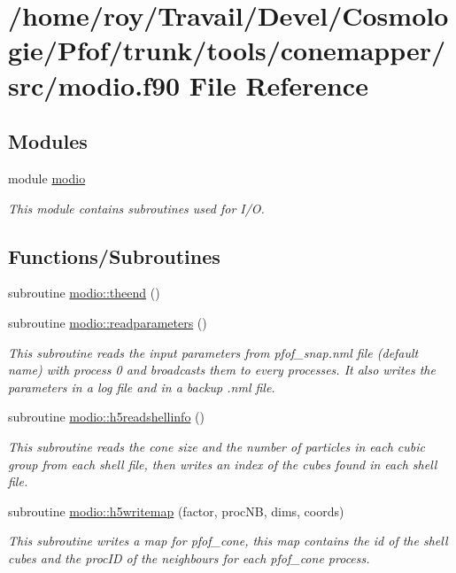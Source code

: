 \hypertarget{tools_2conemapper_2src_2modio_8f90}{}\section{/home/roy/\+Travail/\+Devel/\+Cosmologie/\+Pfof/trunk/tools/conemapper/src/modio.f90 File Reference}
\label{tools_2conemapper_2src_2modio_8f90}
\subsection*{Modules}
\begin{DoxyCompactItemize}
\item 
module \hyperlink{namespacemodio}{modio}
\begin{DoxyCompactList}\small\item\em This module contains subroutines used for I/O. \end{DoxyCompactList}\end{DoxyCompactItemize}
\subsection*{Functions/\+Subroutines}
\begin{DoxyCompactItemize}
\item 
subroutine \hyperlink{namespacemodio_a2688770b2d08498c14ef3212e61d74bf}{modio\+::theend} ()
\item 
subroutine \hyperlink{namespacemodio_aa5e6b5f45cf8cfc091e8e7ff25a97c68}{modio\+::readparameters} ()
\begin{DoxyCompactList}\small\item\em This subroutine reads the input parameters from pfof\+\_\+snap.\+nml file (default name) with process 0 and broadcasts them to every processes. It also writes the parameters in a log file and in a backup .nml file. \end{DoxyCompactList}\item 
subroutine \hyperlink{namespacemodio_a5f1cc94eaee9d1f4f7bdca4cb63ee5bc}{modio\+::h5readshellinfo} ()
\begin{DoxyCompactList}\small\item\em This subroutine reads the cone size and the number of particles in each cubic group from each shell file, then writes an index of the cubes found in each shell file. \end{DoxyCompactList}\item 
subroutine \hyperlink{namespacemodio_aa0fe6635f944f6d4591f52191c7223c1}{modio\+::h5writemap} (factor, proc\+NB, dims, coords)
\begin{DoxyCompactList}\small\item\em This subroutine writes a map for pfof\+\_\+cone, this map contains the id of the shell cubes and the proc\+ID of the neighbours for each pfof\+\_\+cone process. \end{DoxyCompactList}\end{DoxyCompactItemize}
